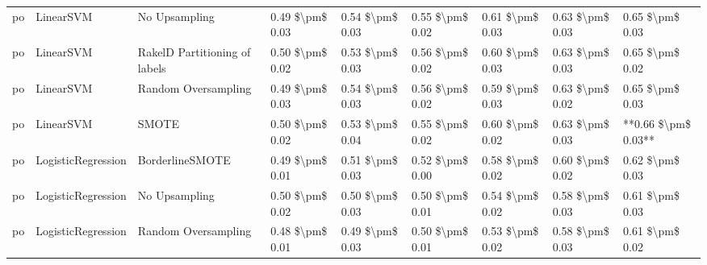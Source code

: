 \begin{tabular}{lllllllll}
      po &                       LinearSVM &                 No Upsampling & 0.49 \$\textbackslash pm\$ 0.03 &           0.54 \$\textbackslash pm\$ 0.03 &       0.55 \$\textbackslash pm\$ 0.02 &        0.61 \$\textbackslash pm\$ 0.03 &                         0.63 \$\textbackslash pm\$ 0.03 &     0.65 \$\textbackslash pm\$ 0.03 \\
      po &                       LinearSVM & RakelD Partitioning of labels & 0.50 \$\textbackslash pm\$ 0.02 &           0.53 \$\textbackslash pm\$ 0.03 &       0.56 \$\textbackslash pm\$ 0.02 &        0.60 \$\textbackslash pm\$ 0.03 &                         0.63 \$\textbackslash pm\$ 0.03 &     0.65 \$\textbackslash pm\$ 0.02 \\
      po &                       LinearSVM &           Random Oversampling & 0.49 \$\textbackslash pm\$ 0.03 &           0.54 \$\textbackslash pm\$ 0.03 &       0.56 \$\textbackslash pm\$ 0.02 &        0.59 \$\textbackslash pm\$ 0.03 &                         0.63 \$\textbackslash pm\$ 0.02 &     0.65 \$\textbackslash pm\$ 0.03 \\
      po &                       LinearSVM &                         SMOTE & 0.50 \$\textbackslash pm\$ 0.02 &           0.53 \$\textbackslash pm\$ 0.04 &       0.55 \$\textbackslash pm\$ 0.02 &        0.60 \$\textbackslash pm\$ 0.02 &                         0.63 \$\textbackslash pm\$ 0.03 & **0.66 \$\textbackslash pm\$ 0.03** \\
      po &              LogisticRegression &               BorderlineSMOTE & 0.49 \$\textbackslash pm\$ 0.01 &           0.51 \$\textbackslash pm\$ 0.03 &       0.52 \$\textbackslash pm\$ 0.00 &        0.58 \$\textbackslash pm\$ 0.02 &                         0.60 \$\textbackslash pm\$ 0.02 &     0.62 \$\textbackslash pm\$ 0.03 \\
      po &              LogisticRegression &                 No Upsampling & 0.50 \$\textbackslash pm\$ 0.02 &           0.50 \$\textbackslash pm\$ 0.03 &       0.50 \$\textbackslash pm\$ 0.01 &        0.54 \$\textbackslash pm\$ 0.02 &                         0.58 \$\textbackslash pm\$ 0.03 &     0.61 \$\textbackslash pm\$ 0.03 \\
      po &              LogisticRegression &           Random Oversampling & 0.48 \$\textbackslash pm\$ 0.01 &           0.49 \$\textbackslash pm\$ 0.03 &       0.50 \$\textbackslash pm\$ 0.01 &        0.53 \$\textbackslash pm\$ 0.02 &                         0.58 \$\textbackslash pm\$ 0.03 &     0.61 \$\textbackslash pm\$ 0.02 \\

\end{tabular}
